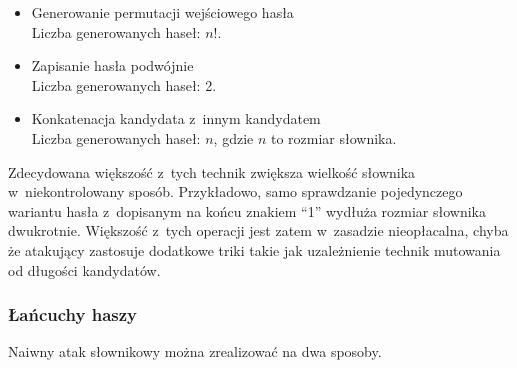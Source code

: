\begin{itemize}
    \item
        Generowanie permutacji wejściowego hasła \\
        Liczba generowanych haseł: $n!$.

    \item
        Zapisanie hasła podwójnie \\
        Liczba generowanych haseł: 2. 

    \item
        Konkatenacja kandydata z~innym kandydatem \\
        Liczba generowanych haseł: $n$, gdzie $n$ to rozmiar słownika.

\end{itemize}

Zdecydowana większość z~tych technik zwiększa wielkość słownika
w~niekontrolowany sposób. Przykładowo, samo sprawdzanie pojedynczego wariantu
hasła z~dopisanym na końcu znakiem ``1'' wydłuża rozmiar słownika dwukrotnie.
Większość z~tych operacji jest zatem w~zasadzie nieopłacalna, chyba że
atakujący zastosuje dodatkowe triki takie jak uzależnienie technik mutowania od
długości kandydatów.



\subsubsection{Łańcuchy haszy}
Naiwny atak słownikowy można zrealizować na dwa sposoby.

